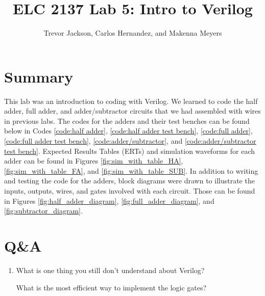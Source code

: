 \documentclass[11pt]{article}
\begin{document}
\title{ELC 2137 Lab 5: Intro to Verilog}
\author{Trevor Jackson, Carlos Hernandez, and Makenna Meyers}

\maketitle


\section*{Summary}

This lab was an introduction to coding with Verilog. We learned to code the half adder, full adder, and adder/subtractor circuits that we had assembled with wires in previous labs. The codes for the adders and their test benches can be found below in Codes \ref{code:half adder}, \ref{code:half adder test bench}, \ref{code:full adder}, \ref{code:full adder test bench}, \ref{code:adder/subtractor}, and \ref{code:adder/subtractor test bench}. Expected Results Tables (ERTs) and simulation waveforms for each adder can be found in Figures \ref{fig:sim_with_table_HA}, \ref{fig:sim_with_table_FA}, and \ref{fig:sim_with_table_SUB}. In addition to writing and testing the code for the adders, block diagrams were drawn to illustrate the inputs, outputs, wires, and gates involved with each circuit. Those can be found in Figures \ref{fig:half_adder_diagram}, \ref{fig:full_adder_diagram}, and \ref{fig:subtractor_diagram}.

\section*{Q\&A}

\begin{enumerate}
	\item What is one thing you still don't understand about Verilog?
	
	What is the most efficient way to implement the logic gates?
	
\end{enumerate}
\end{document}
